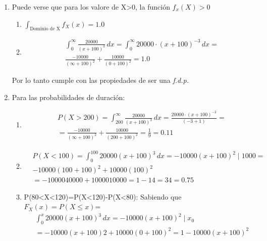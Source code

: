 \begin{enumerate}
    \item Puede verse que para los valore de X>0, la función $f_x(X)>0$
          \begin{enumerate}
              \item $\int_{\text{Dominio de X}}f_X(x)=1.0$
              \item \begin{align*}
                         & \int_0^{\infty} \frac{20000}{\left(x+100 \right)^3}\,dx=\int_0^{\infty} 20000\cdot \left(x+100 \right)^{-3}\,dx= \\
                         & \frac{-10000}{\left(\infty+100 \right)^2}+\frac{10000}{\left(0+100 \right)^2}=1.0
                    \end{align*}
          \end{enumerate}
          Por lo tanto cumple con las propiedades de ser una \textit{f.d.p.}
    \item Para las probabilidades de duración:
          \begin{enumerate}
              \item \begin{align*}
                         & P(X>200)=\int_{200}^{\infty}\frac{20000}{\left(x+100 \right)^3}\,dx=\frac{20000\cdot\left(x+100\right)^{-2}}{\left(-3+1\right)}= \\
                         & =\frac{-10000}{(\infty +100)^2}+\frac{10000}{(200+100)^2}=\frac{1}{9}=0.11
                    \end{align*}
              \item \begin{align*}
                         & P(X<100)=\int_0^{100} 20000\left(x+100 \right)^3\,dx=-10000\left(x+100 \right)^2\mid 1000= \\
                         & -10000\left(100+100 \right)^2+10000\left(100 \right)^2\\
                 &=-1000040000+1000010000=1-14=34=0.75
                    \end{align*}
              \item P(80<X<120)=P(X<120)-P(X<80): Sabiendo que $F_X(x)=P(X\leq x)$=
                    \begin{align*}
                         & \int_0^x 20000\left(x+100 \right)^3\,dx=-10000\left(x+100 \right)^2\mid x_0\\
                         &=-10000( x+100)2+10000(0+100)^2 
                          =1-10000\left(x+100 \right)^2
                    \end{align*}

\end{enumerate}
\end{enumerate}
